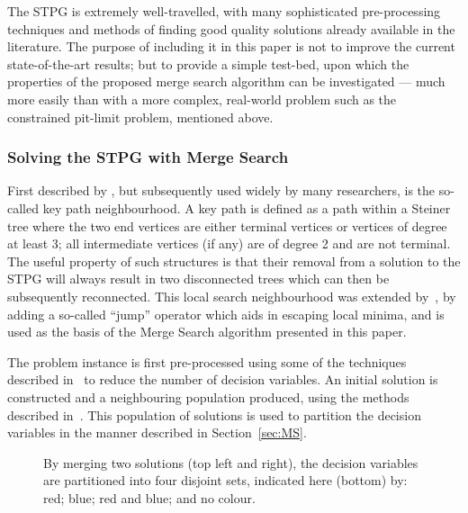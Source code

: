 \documentclass[journal]{IEEEtran}
\begin{document}
The STPG is extremely well-travelled, with many sophisticated pre-processing techniques and methods of finding good quality solutions already available in the literature. The purpose of including it in this paper is not to improve the current state-of-the-art results; but to provide a simple test-bed, upon which the properties of the proposed merge search algorithm can be investigated --- much more easily than with a more complex, real-world problem such as the constrained pit-limit problem, mentioned above.

\subsubsection{Solving the STPG with Merge Search}

First described by \cite{kp:dowsland}, but subsequently used widely by 
many researchers, is the so-called key path neighbourhood.
A key path is defined as a path within a Steiner tree where the two end vertices are
either terminal vertices or vertices of degree at least 3; all intermediate 
vertices (if any) are of degree 2 and are not terminal. The useful property of such
structures is that their removal from a solution to the STPG will always result in two disconnected
trees which can then be subsequently reconnected. This local search neighbourhood was extended by~\cite{Kenny:2016}, by adding a so-called ``jump'' operator which aids in escaping local minima, and is used as the basis of the Merge Search algorithm presented in this paper.

The problem instance is first pre-processed using some of the techniques described in~\cite{pp:duin,pp:uchoa,stpg-reduce} to reduce the number of decision variables. An initial solution is constructed and a neighbouring population produced, using the methods described in~\cite{Kenny:2016}. This population of solutions is used to partition the decision variables in the manner described in Section~\ref{sec:MS}.

\begin{figure}[h]
\centering
{}
    \caption[Partitioning variables by merging solutions]{By merging two solutions (top left and right), the decision variables are partitioned into four disjoint sets, indicated here (bottom) by: red; blue; red and blue; and no colour.}\label{fig:stpg-partition} 
\end{figure}
\end{document}
